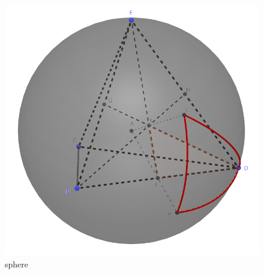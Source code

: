 \documentclass{article}
\begin{document}
\begin{figure}[ht]
\begin{minipage}{0.32\linewidth}
        \includegraphics[width=0.9\linewidth]{sphere.png}
        \caption{sphere}
        \label{sphere}
    \end{minipage}
\end{figure}

\newpage
\end{document}
